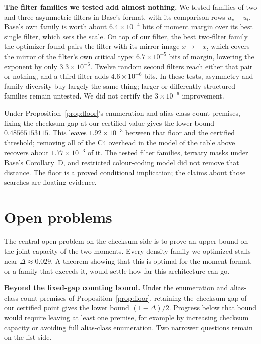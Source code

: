 \documentclass[11pt]{article}
\theoremstyle{plain}
\begin{document}
\textbf{The filter families we tested add almost nothing.} We tested families of two and three asymmetric filters in Base's format, with its comparison rows $u_v - u_l$. Base's own family is worth about $6.4\times10^{-4}$ bits of moment margin over its best single filter, which sets the scale. On top of our filter, the best two-filter family the optimizer found pairs the filter with its mirror image $x \to -x$, which covers the mirror of the filter's own critical type: $6.7\times10^{-5}$ bits of margin, lowering the exponent by only $3.3\times10^{-6}$. Twelve random second filters reach either that pair or nothing, and a third filter adds $4.6\times10^{-6}$ bits. In these tests, asymmetry and family diversity buy largely the same thing; larger or differently structured families remain untested. We did not certify the $3\times10^{-6}$ improvement.

Under Proposition~\ref{prop:floor}'s enumeration and alias-class-count premises, fixing the checksum gap at our certified value gives the lower bound $0.48565153115$. This leaves $1.92\times10^{-3}$ between that floor and the certified threshold; removing all of the C4 overhead in the model of the table above recovers about $1.77\times10^{-3}$ of it. The tested filter families, ternary masks under Base's Corollary~D, and restricted colour-coding model did not remove that distance. The floor is a proved conditional implication; the claims about those searches are floating evidence.

\section{Open problems}

The central open problem on the checksum side is to prove an upper bound on the joint capacity of the two moments. Every density family we optimized stalls near $\Delta \approx 0.029$. A theorem showing that this is optimal for the moment format, or a family that exceeds it, would settle how far this architecture can go.

\textbf{Beyond the fixed-gap counting bound.} Under the enumeration and alias-class-count premises of Proposition~\ref{prop:floor}, retaining the checksum gap of our certified point gives the lower bound $(1-\Delta)/2$. Progress below that bound would require leaving at least one premise, for example by increasing checksum capacity or avoiding full alias-class enumeration. Two narrower questions remain on the list side.
\end{document}
